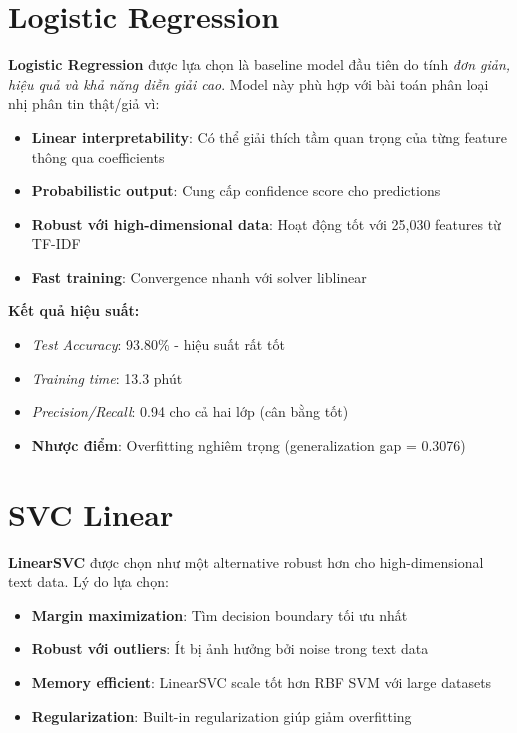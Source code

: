 \section{Logistic Regression}

\textbf{Logistic Regression} được lựa chọn là baseline model đầu tiên do tính \textit{đơn giản, hiệu quả và khả năng diễn giải cao}. Model này phù hợp với bài toán phân loại nhị phân tin thật/giả vì:

\begin{itemize}
    \item \textbf{Linear interpretability}: Có thể giải thích tầm quan trọng của từng feature thông qua coefficients
    \item \textbf{Probabilistic output}: Cung cấp confidence score cho predictions
    \item \textbf{Robust với high-dimensional data}: Hoạt động tốt với 25,030 features từ TF-IDF
    \item \textbf{Fast training}: Convergence nhanh với solver liblinear
\end{itemize}

\textbf{Kết quả hiệu suất:}
\begin{itemize}
    \item \textit{Test Accuracy}: 93.80\% - hiệu suất rất tốt
    \item \textit{Training time}: 13.3 phút 
    \item \textit{Precision/Recall}: 0.94 cho cả hai lớp (cân bằng tốt)
    \item \textbf{Nhược điểm}: Overfitting nghiêm trọng (generalization gap = 0.3076)
\end{itemize}

\section{SVC Linear}

\textbf{LinearSVC} được chọn như một alternative robust hơn cho high-dimensional text data. Lý do lựa chọn:

\begin{itemize}
    \item \textbf{Margin maximization}: Tìm decision boundary tối ưu nhất
    \item \textbf{Robust với outliers}: Ít bị ảnh hưởng bởi noise trong text data
    \item \textbf{Memory efficient}: LinearSVC scale tốt hơn RBF SVM với large datasets
    \item \textbf{Regularization}: Built-in regularization giúp giảm overfitting
\end{itemize}

